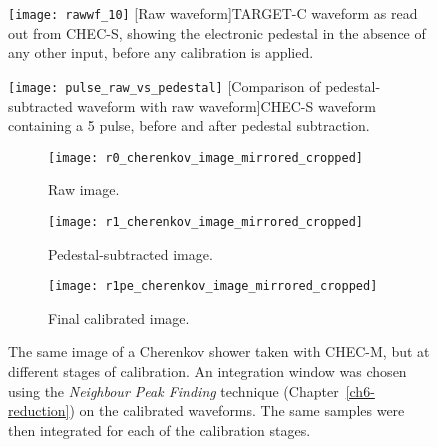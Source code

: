 \begin{figure}
\begin{minipage}[t]{.49\textwidth}
  \centering
  \texttt{[image: rawwf\_10]} 
  [Raw waveform]{TARGET-C waveform as read out from CHEC-S, showing the electronic pedestal in the absence of any other input, before any calibration is applied.}
  \label{fig:rawwf}
\end{minipage}%
\hfill
\begin{minipage}[t]{.49\textwidth}
  \centering
  \texttt{[image: pulse\_raw\_vs\_pedestal]}
  [Comparison of pedestal-subtracted waveform with raw waveform]{CHEC-S waveform  containing a \SI{5}{\pe} pulse, before and after pedestal subtraction.}
  \label{fig:pulse_raw_vs_pedestal}
\end{minipage}
\end{figure}

\begin{figure}
  \begin{subfigure}[b]{0.49\textwidth}
    \texttt{[image: r0\_cherenkov\_image\_mirrored\_cropped]}
    \caption{Raw image.}
    \label{fig:r0_cherenkov_image_mirrored_cropped}
  \end{subfigure}
  \hfill
  \begin{subfigure}[b]{0.49\textwidth}
    \texttt{[image: r1\_cherenkov\_image\_mirrored\_cropped]}
    \caption{Pedestal-subtracted image.}
    \label{fig:r1_cherenkov_image_mirrored_cropped}
  \end{subfigure}
  \centering
  \begin{subfigure}[b]{0.49\textwidth}
    \texttt{[image: r1pe\_cherenkov\_image\_mirrored\_cropped]}
    \caption{Final calibrated image.}
    \label{fig:r1pe_cherenkov_image_mirrored_cropped}
  \end{subfigure}
  \caption[Comparison of calibration stages with a Cherenkov shower image.]{The same image of a Cherenkov shower taken with CHEC-M, but at different stages of calibration. An integration window was chosen using the \textit{Neighbour Peak Finding} technique (Chapter~\ref{ch6-reduction}) on the \si{\pe} calibrated waveforms. The same samples were then integrated for each of the calibration stages.}
\end{figure}

